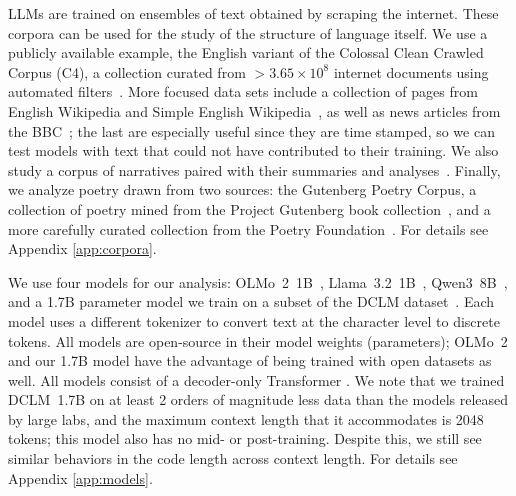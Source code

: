 \documentclass[aps,twocolumn,floats,prx]{revtex4}
\begin{document}
LLMs are trained on ensembles of text obtained by scraping the internet. These corpora can be used for the study of the structure of language itself. 
We use a publicly available example, the English variant of the Colossal Clean Crawled Corpus (C4), a collection curated from $> 3.65 \times 10^8$ internet documents using automated filters~\cite{raffel2019exploring,dodge2021documenting}. 
More focused data sets include a collection of pages from English Wikipedia and Simple English Wikipedia~\cite{wikidump}, as well as news articles from the BBC~\cite{li2024latesteval}; the last are especially useful since they are time stamped, so we can test models with text that could not have contributed to their training. We also study a corpus of narratives paired with their summaries and analyses~\cite{kryscinski2021booksum}.
Finally, we analyze poetry drawn from two sources: the Gutenberg Poetry Corpus, a collection of poetry mined from the Project Gutenberg book collection~\cite{parrish_gutenberg_poetry_corpus}, and a more carefully curated collection from the Poetry Foundation~\cite{suayptalha_poetry_foundation_poems_hf}. For details see Appendix \ref{app:corpora}.

We use four models for our analysis: OLMo~2~1B~\cite{olmo20242olmo2furious}, Llama~3.2~1B~\cite{grattafiori2024llama3herdmodels}, Qwen3~8B~\cite{qwen3technicalreport}, and a 1.7B parameter model we train on a subset of the DCLM dataset~\cite{li2024datacomplm}. Each model uses a different tokenizer to convert text at the character level to discrete tokens. All models are open-source in their model weights (parameters);  OLMo~2 and our 1.7B  model have the advantage of being trained with open datasets as well. All models consist of a decoder-only Transformer \cite{vaswani2017attention}. We note that we trained DCLM~1.7B  on at least 2 orders of magnitude less data than the models released by large labs, and the maximum context length that it accommodates is 2048 tokens; this model also has no mid- or post-training. Despite this, we still see similar behaviors in the code length across context length. For details see Appendix \ref{app:models}.
\end{document}
